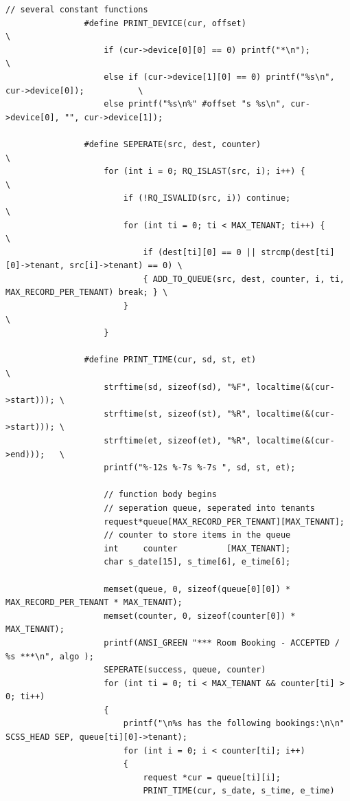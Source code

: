 \documentclass{article}
\begin{document}
\begin{Verbatim}[gobble=8]
                // several constant functions
                #define PRINT_DEVICE(cur, offset)                                              \
                    if (cur->device[0][0] == 0) printf("*\n");                                 \
                    else if (cur->device[1][0] == 0) printf("%s\n", cur->device[0]);           \
                    else printf("%s\n%" #offset "s %s\n", cur->device[0], "", cur->device[1]);
                
                #define SEPERATE(src, dest, counter)                                                  \
                    for (int i = 0; RQ_ISLAST(src, i); i++) {                                         \
                        if (!RQ_ISVALID(src, i)) continue;                                            \
                        for (int ti = 0; ti < MAX_TENANT; ti++) {                                     \
                            if (dest[ti][0] == 0 || strcmp(dest[ti][0]->tenant, src[i]->tenant) == 0) \
                            { ADD_TO_QUEUE(src, dest, counter, i, ti, MAX_RECORD_PER_TENANT) break; } \
                        }                                                                             \
                    }
                
                #define PRINT_TIME(cur, sd, st, et)                           \
                    strftime(sd, sizeof(sd), "%F", localtime(&(cur->start))); \
                    strftime(st, sizeof(st), "%R", localtime(&(cur->start))); \
                    strftime(et, sizeof(et), "%R", localtime(&(cur->end)));   \
                    printf("%-12s %-7s %-7s ", sd, st, et);
                
                    // function body begins
                    // seperation queue, seperated into tenants
                    request*queue[MAX_RECORD_PER_TENANT][MAX_TENANT];
                    // counter to store items in the queue
                    int     counter          [MAX_TENANT];
                    char s_date[15], s_time[6], e_time[6];
                
                    memset(queue, 0, sizeof(queue[0][0]) * MAX_RECORD_PER_TENANT * MAX_TENANT);
                    memset(counter, 0, sizeof(counter[0]) * MAX_TENANT);
                    printf(ANSI_GREEN "*** Room Booking - ACCEPTED / %s ***\n", algo );
                    SEPERATE(success, queue, counter)
                    for (int ti = 0; ti < MAX_TENANT && counter[ti] > 0; ti++)
                    {
                        printf("\n%s has the following bookings:\n\n" SCSS_HEAD SEP, queue[ti][0]->tenant);
                        for (int i = 0; i < counter[ti]; i++)
                        {
                            request *cur = queue[ti][i];
                            PRINT_TIME(cur, s_date, s_time, e_time)
                

\end{Verbatim}
\end{document}
